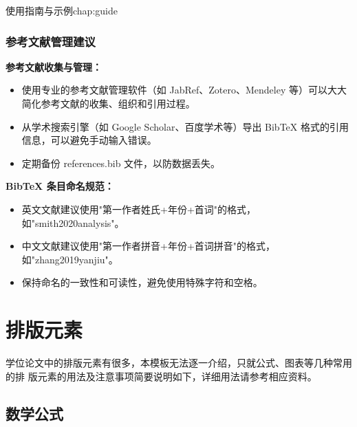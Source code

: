 \begin{cuzchapter}{使用指南与示例}{chap:guide}
    \subsubsection{参考文献管理建议}\label{subsub:bibliography-management}

    \begin{leftbar}
        \noindent\textbf{参考文献收集与管理：}
        \begin{itemize}
            \item 使用专业的参考文献管理软件（如 JabRef、Zotero、Mendeley 等）可以大大简化参考文献的收集、组织和引用过程。
            \item 从学术搜索引擎（如 Google Scholar、百度学术等）导出 BibTeX 格式的引用信息，可以避免手动输入错误。
            \item 定期备份 references.bib 文件，以防数据丢失。
        \end{itemize}

        \noindent\textbf{BibTeX 条目命名规范：}
        \begin{itemize}
            \item 英文文献建议使用"第一作者姓氏+年份+首词"的格式，如"smith2020analysis"。
            \item 中文文献建议使用"第一作者拼音+年份+首词拼音"的格式，如"zhang2019yanjiu"。
            \item 保持命名的一致性和可读性，避免使用特殊字符和空格。
        \end{itemize}
    \end{leftbar}

    \section{排版元素}\label{sec:elements}

    学位论文中的排版元素有很多，本模板无法逐一介绍，只就公式、图表等几种常用的排
    版元素的用法及注意事项简要说明如下，详细用法请参考相应资料。

    \subsection{数学公式}\label{sub:equations}


\end{cuzchapter}
